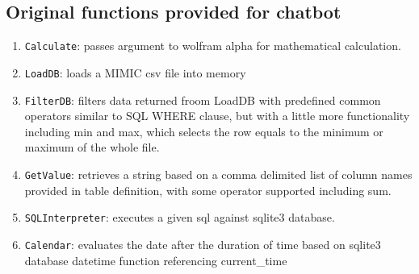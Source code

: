 \documentclass[screen,review]{acmart}
\begin{document}
\subsection{Original functions provided for chatbot}
\begin{enumerate}
  \item{\texttt{Calculate}}: passes argument to wolfram alpha for mathematical calculation.
  \item{\texttt{LoadDB}}: loads a MIMIC csv file into memory
  \item{\texttt{FilterDB}}: filters data returned froom LoadDB with predefined common operators similar to SQL WHERE clause, 
  but with a little more functionality including min and max, which selects the row equals to the minimum or maximum of the whole file. 
  \item {\texttt{GetValue}}: retrieves a string based on a comma delimited list of column names 
  provided in table definition, with some operator supported including sum.
  \item {\texttt{SQLInterpreter}}: executes a given sql against sqlite3 database.
  \item {\texttt{Calendar}}: evaluates the date after the duration of time based on sqlite3 database
  datetime function referencing current\_time
\end{enumerate}
\end{document}
